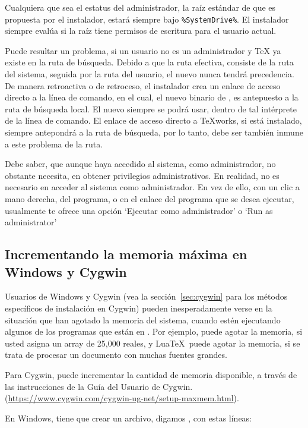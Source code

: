 \documentclass{article}
\begin{document}
Cualquiera que sea el estatus del administrador, la raíz estándar de
\TL{} que es propuesta por el instalador, estará siempre bajo
\verb|%SystemDrive%|. El instalador siempre evalúa si la raíz tiene
permisos de escritura para el usuario actual.

Puede resultar un problema, si un usuario no es un administrador y \TeX{}
ya existe en la ruta de búsqueda. Debido a que la ruta efectiva, consiste
de la ruta del sistema, seguida por la ruta del usuario, el nuevo \TL{}
nunca tendrá precedencia. De manera retroactiva o de retroceso, el instalador crea un
enlace de acceso directo a la línea de comando, en el cual, el nuevo
binario de \TL{}, es antepuesto a la ruta de búsqueda local. El nuevo
\TL{} siempre se podrá usar, dentro de tal intérprete de la línea de
comando. El enlace de acceso directo a \TeX{}works, si está instalado,
siempre antepondrá \TL{} a la ruta de búsqueda, por lo tanto, debe ser
también inmune a este problema de la ruta. 

Debe saber, que aunque haya accedido al sistema, como administrador, no
obstante necesita, en obtener privilegios administrativos. En realidad, no es
necesario en acceder al sistema como administrador. En vez de ello, con un clic
a mano derecha, del programa, o en el enlace del programa que se desea
ejecutar, usualmente te ofrece una opción `Ejecutar como administrador' o `Run as administrator'

\subsection{Incrementando la memoria máxima en Windows y Cygwin}
\label{sec:cygwin-maxmem}

Usuarios de Windows y Cygwin (vea la sección~\ref{sec:cygwin} para los
métodos específicos de instalación en Cygwin) pueden inesperadamente
verse en la situación que han agotado la memoria del sistema, cuando
estén ejecutando algunos de los programas que están en \TL{}.  Por
ejemplo,  puede agotar la memoria, si usted asigna un array
de 25,000 reales, y Lua\TeX\ puede agotar la memoria, si se trata de
procesar un documento con muchas fuentes grandes. 

Para Cygwin, puede incrementar la cantidad de memoria disponible, a través
de las instrucciones de la Guía del Usuario de Cygwin.  
(\url{https://www.cygwin.com/cygwin-ug-net/setup-maxmem.html}).

En Windows, tiene que crear un archivo, digamos , con
estas líneas:
\end{document}
